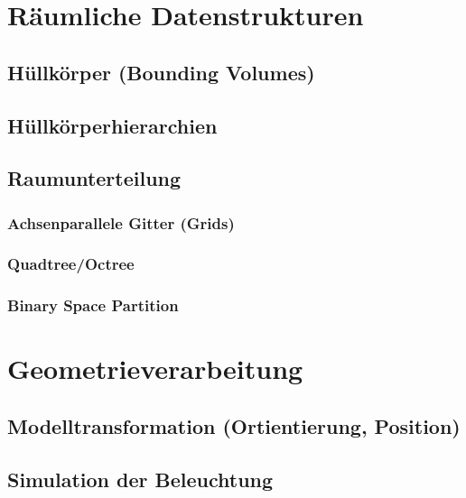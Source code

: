 \documentclass[a4paper, 11pt, accentcolor = tud3b]{tudreport}
\begin{document}
		\section{Räumliche Datenstrukturen} %

			\subsection{Hüllkörper (Bounding Volumes)} %

			\subsection{Hüllkörperhierarchien} %

			\subsection{Raumunterteilung} %

				\subsubsection{Achsenparallele Gitter (Grids)} %

				\subsubsection{Quadtree/Octree} %

				\subsubsection{Binary Space Partition} %

		\section{Geometrieverarbeitung} %

			\subsection{Modelltransformation (Ortientierung, Position)} %

			\subsection{Simulation der Beleuchtung} %
\end{document}
